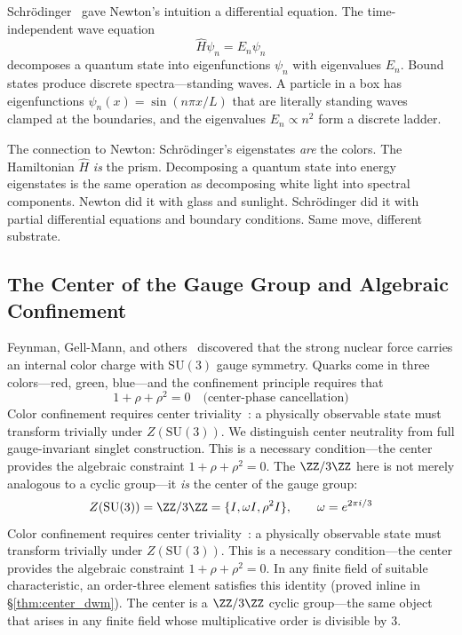 Schr\"odinger~\cite{schrodinger} gave Newton's intuition a differential equation. The time-independent wave equation
\begin{equation}\label{eq:schrodinger}
\hat{H}\psi_n = E_n \psi_n
\end{equation}
decomposes a quantum state into eigenfunctions $\psi_n$ with eigenvalues $E_n$. Bound states produce discrete spectra---standing waves. A particle in a box has eigenfunctions $\psi_n(x) = \sin(n\pi x / L)$ that are literally standing waves clamped at the boundaries, and the eigenvalues $E_n \propto n^2$ form a discrete ladder.

The connection to Newton: Schr\"odinger's eigenstates \emph{are} the colors. The Hamiltonian $\hat{H}$ \emph{is} the prism. Decomposing a quantum state into energy eigenstates is the same operation as decomposing white light into spectral components. Newton did it with glass and sunlight. Schr\"odinger did it with partial differential equations and boundary conditions. Same move, different substrate.

\subsection{The Center of the Gauge Group and Algebraic Confinement}

Feynman, Gell-Mann, and others~\cite{feynman_qcd,gellmann} discovered that the strong nuclear force carries an internal color charge with $\mathrm{SU}(3)$ gauge symmetry. Quarks come in three colors---red, green, blue---and the confinement principle requires that 
\begin{equation}\label{eq:confinement}
1 + \rho + \rho^2 = 0 \quad \text{(center-phase cancellation)}
\end{equation}
Color confinement requires center triviality~\cite{greensite}: a physically observable state must transform trivially under $Z(\mathrm{SU}(3))$. We distinguish center neutrality from full gauge-invariant singlet construction. This is a necessary condition---the center provides the algebraic constraint $1 + \rho + \rho^2 = 0$. The $\ZZ/3\ZZ$ here is not merely analogous to a cyclic group---it \emph{is} the center of the gauge group:
\begin{equation}\label{eq:center}
Z(\mathrm{SU}(3)) = \ZZ/3\ZZ = \{I, \omega I, \rho^2 I\}, \qquad \omega = e^{2\pi i/3}
\end{equation}
Color confinement requires center triviality~\cite{greensite}: a physically observable state must transform trivially under $Z(\mathrm{SU}(3))$. This is a necessary condition---the center provides the algebraic constraint $1 + \rho + \rho^2 = 0$. In any finite field of suitable characteristic, an order-three element satisfies this identity (proved inline in \S\ref{thm:center_dwm}). The center is a $\ZZ/3\ZZ$ cyclic group---the same object that arises in any finite field whose multiplicative order is divisible by 3.

